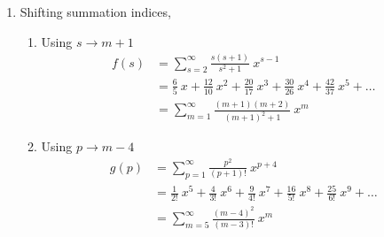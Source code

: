 \begin{enumerate}
    \item Shifting summation indices,
          \begin{enumerate}
              \item Using $ s \to m+1 $
                    \begin{align}
                        f(s) & = \sum_{s = 2}^{\infty}\frac{s(s+1)}
                        {s^2 + 1}\ x^{s-1}                               \\
                             & = \frac{6}{5}\ x + \frac{12}{10}\ x^2
                        + \frac{20}{17}\ x^3 + \frac{30}{26}\ x^4
                        + \frac{42}{37}\ x^5 + \dots                     \\
                             & = \sum_{m = 1}^{\infty} \frac{(m+1)(m+2)}
                        {(m+1)^2 + 1}\ x^m
                    \end{align}
              \item Using $ p \to m-4$
                    \begin{align}
                        g(p) & = \sum_{p = 1}^{\infty}\frac{p^2}
                        {(p+1)!}\ x^{p+4}                              \\
                             & = \frac{1}{2!}\ x^5 + \frac{4}{3!}\ x^6
                        + \frac{9}{4!}\ x^7 + \frac{16}{5!}\ x^8
                        + \frac{25}{6!}\ x^9 + \dots                   \\
                             & = \sum_{m = 5}^{\infty} \frac{(m-4)^2}
                        {(m-3)!}\ x^m
                    \end{align}
          \end{enumerate}


\end{enumerate}
